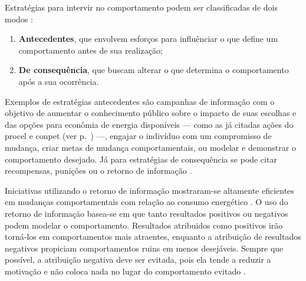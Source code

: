 Estratégias para intervir no comportamento podem ser classificadas de dois modos
\cite{aceee_2010_estudos_feedback,2009_epri}:
\begin{enumerate}
\item \textbf{Antecedentes}, que envolvem esforços para influênciar o que define 
um comportamento antes de sua realização; 
\item \textbf{De consequência}, que buscam alterar o que determina o 
comportamento após a sua ocorrência. 
\end{enumerate}

Exemplos de estratégias antecedentes são campanhas de informação 
com o objetivo de aumentar o conhecimento público sobre o impacto de suas 
escolhas e das opções para econômia de energia disponíveis --- como 
as já citadas ações do \gls{procel} e \gls{conpet} (ver p.~\pageref{text:prog_cepel}) ---,
engajar o indivíduo com um compromisso de mudança, criar metas de mudança
comportamentais, ou modelar e demonstrar o comportamento desejado. Já para
estratégias de consequência se pode citar recompensas, punições ou o
retorno de informação \cite{aceee_2010_estudos_feedback,2009_epri}. 

Iniciativas utilizando o retorno de informação mostraram-se altamente eficientes
em mudanças comportamentais com relação ao consumo energético \cite{
aceee_2010_estudos_feedback,2009_epri,2012_schleich__austria,
2011_zhifeng_smart_energy_savings,2006_darby,2009_nber_studies_us,
ucla_studies_1975_2011_usa}. O uso do retorno
de informação basea-se em que tanto resultados positivos ou
negativos podem modelar o comportamento. Resultados atribuidos como positivos 
irão torná-los em comportamentos mais atraentes, enquanto a atribuição de
resultados negativos propiciam comportamentos ruins em menos desejáveis. 
Sempre que possível, a atribuição negativa 
deve ser evitada, pois ela tende a reduzir a motivação e não coloca nada no 
lugar do comportamento evitado \cite{2010_aspectos_psicologicos_usa}.

